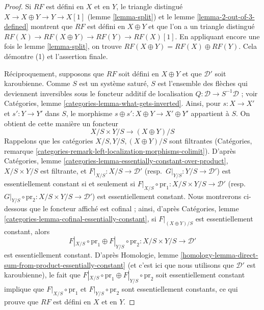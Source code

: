 \begin{proof}
Si $RF$ est défini en $X$ et en $Y$, le triangle distingué
$X \to X \oplus Y \to Y \to X[1]$ (lemme \ref{lemma-split}) et le
lemme \ref{lemma-2-out-of-3-defined} montrent que $RF$ est défini en
$X \oplus Y$ et que l'on a un triangle distingué
$RF(X) \to RF(X \oplus Y) \to RF(Y) \to RF(X)[1]$. En appliquant encore une
fois le lemme \ref{lemma-split}, on trouve
$RF(X \oplus Y) = RF(X) \oplus RF(Y)$. Cela démontre (1) et l'assertion
finale.

\medskip\noindent
Réciproquement, supposons que $RF$ soit défini en $X \oplus Y$ et que
$\mathcal{D}'$ soit karoubienne. Comme $S$ est un système saturé, $S$ est
l'ensemble des flèches qui deviennent inversibles sous le foncteur additif de
localisation $Q : \mathcal{D} \to S^{-1}\mathcal{D}$ ; voir Catégories, lemme
\ref{categories-lemma-what-gets-inverted}. Ainsi, pour
$s : X \to X'$ et $s' : Y \to Y'$ dans $S$, le morphisme
$s \oplus s' : X \oplus Y \to X' \oplus Y'$ appartient à $S$. On obtient de
cette manière un foncteur
$$
X/S \times Y/S \longrightarrow (X \oplus Y)/S
$$
Rappelons que les catégories $X/S, Y/S, (X \oplus Y)/S$ sont filtrantes
(Catégories, remarque
\ref{categories-remark-left-localization-morphisms-colimit}). D'après
Catégories, lemme \ref{categories-lemma-essentially-constant-over-product},
$X/S \times Y/S$ est filtrante, et
$F|_{X/S} : X/S \to \mathcal{D}'$ (resp.\
$G|_{Y/S} : Y/S \to \mathcal{D}'$) est essentiellement constant si et
seulement si
$F|_{X/S} \circ \text{pr}_1 : X/S \times Y/S \to \mathcal{D}'$ (resp.\
$G|_{Y/S} \circ \text{pr}_2 : X/S \times Y/S \to \mathcal{D}'$) est
essentiellement constant. Nous montrerons ci-dessous que le foncteur affiché
est cofinal ; ainsi, d'après Catégories, lemme
\ref{categories-lemma-cofinal-essentially-constant}, si
$F|_{(X \oplus Y)/S}$ est essentiellement constant, alors
$$
F|_{X/S} \circ \text{pr}_1 \oplus F|_{Y/S} \circ \text{pr}_2 :
X/S \times Y/S \to \mathcal{D}'
$$
est essentiellement constant. D'après Homologie, lemme
\ref{homology-lemma-direct-sum-from-product-essentially-constant}
(et c'est ici que nous utilisons que $\mathcal{D}'$ est karoubienne), le fait
que
$F|_{X/S} \circ \text{pr}_1 \oplus F|_{Y/S} \circ \text{pr}_2$ soit
essentiellement constant implique que
$F|_{X/S} \circ \text{pr}_1$ et $F|_{Y/S} \circ \text{pr}_2$ sont
essentiellement constants, ce qui prouve que $RF$ est défini en $X$ et en $Y$.


\end{proof}
